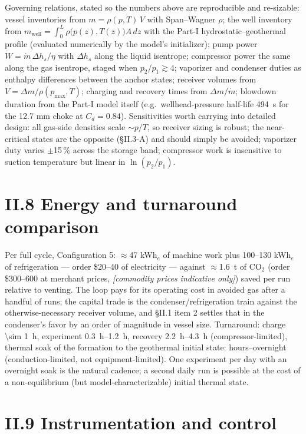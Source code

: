 Governing relations, stated so the numbers above are reproducible and
re-sizable: vessel inventories from
$m = \rho(p,T)\,V$ with Span--Wagner $\rho$; the well inventory from
$m_{\mathrm{well}} = \int_0^L \rho\bigl(p(z),T(z)\bigr)A\,dz$ with
the Part-I hydrostatic--geothermal profile (evaluated numerically by
the model's initializer); pump power $\dot W = \dot m\,\Delta h_s/\eta$
with $\Delta h_s$ along the liquid isentrope; compressor power the
same along the gas isentrope, staged when $p_2/p_1 \gtrsim 4$;
vaporizer and condenser duties as enthalpy differences between the
anchor states; receiver volumes from $V = \Delta m/\rho(p_{\max},T)$;
charging and recovery times from $\Delta m/\dot m$; blowdown duration
from the Part-I model itself (e.g.\ wellhead-pressure half-life
\SI{494}{s} for the 12.7 mm choke at $C_d = 0.84$). Sensitivities
worth carrying into detailed design: all gas-side densities scale
$\sim p/T$, so receiver sizing is robust; the near-critical states
are the opposite (\S II.3-A) and should simply be avoided; vaporizer
duty varies $\pm$15\,\% across the storage band; compressor work is
insensitive to suction temperature but linear in $\ln(p_2/p_1)$.

\section{II.8 Energy and turnaround comparison}

Per full cycle, Configuration 5: $\approx$47 kWh$_{e}$ of machine
work plus 100--130 kWh$_{e}$ of refrigeration --- order
\$20--40 of electricity --- against $\approx$\SI{1.6}{t} of CO$_2$
(order \$300--600 at merchant prices, \emph{[commodity prices
indicative only]}) saved per run relative to venting. The loop pays
for its operating cost in avoided gas after a handful of runs; the
capital trade is the condenser/refrigeration train against the
otherwise-necessary receiver volume, and \S II.1 item 2 settles that
in the condenser's favor by an order of magnitude in vessel size.
Turnaround: charge \SI{\sim 1}{h}, experiment
\SIrange{0.3}{1.2}{h}, recovery \SIrange{2.2}{4.3}{h}
(compressor-limited), thermal soak of the formation to the geothermal
initial state: hours--overnight (conduction-limited, not
equipment-limited). One experiment per day with an overnight soak is
the natural cadence; a second daily run is possible at the cost of a
non-equilibrium (but model-characterizable) initial thermal state.

\section{II.9 Instrumentation and control}

